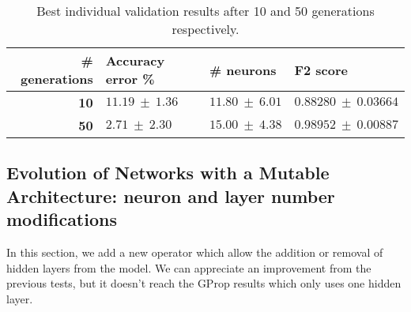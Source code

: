 \documentclass[runningheads]{llncs}
\begin{document}
\begin{table}
    \centering
    \caption{
        Best individual validation results after 10 and 50 generations
        respectively.
    }
    \label{tab:deepgprop-miniheli-validation}
    \begin{tabular}{rlll}
        \textbf{\# generations} & \textbf{Accuracy error \%} & \textbf{\# neurons} & \textbf{F2 score} \\
        \hline
        \textbf{10}             & $11.19\ \pm\ 1.36$ & $11.80\ \pm\ 6.01$ & $0.88280\ \pm\ 0.03664$ \\
        \textbf{50}             & $2.71\ \pm\ 2.30$ & $15.00\ \pm\ 4.38$ & $0.98952\ \pm\ 0.00887$ \\
    \end{tabular}
\end{table}


\subsection{Evolution of Networks with a Mutable Architecture: neuron and layer number modifications}


In this section, we add a new operator which allow the addition or removal of
hidden layers from the model. We can appreciate %
an improvement from the
previous tests, but it doesn't reach the GProp results which only uses one
hidden layer.

\end{document}
